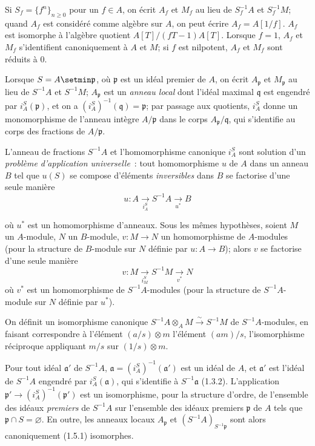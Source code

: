 \begin{env}[1.2.3]
\label{0.1.2.3-fr}
Si $S_f=\{f^n\}_{n\geq 0}$ pour un $f\in A$, on écrit $A_f$ et $M_f$ au lieu de $S_f^{-1}A$ et $S_f^{-1}M$; quand $A_f$ est considéré comme algèbre sur $A$, on peut écrire $A_f=A[1/f]$.
$A_f$ est isomorphe à l'algèbre quotient $A[T]/(fT-1)A[T]$.
Lorsque $f=1$, $A_f$ et $M_f$ s'identifient canoniquement à $A$ et $M$; si $f$ est nilpotent, $A_f$ et $M_f$ sont réduits à $0$.

Lorsque $S=A\setmin\mathfrak{p}$, où $\mathfrak{p}$ est un idéal premier de $A$, on écrit $A_{\mathfrak{p}}$ et $M_{\mathfrak{p}}$ au lieu de $S^{-1}A$ et $S^{-1}M$; $A_{\mathfrak{p}}$ est un \emph{anneau local} dont l'idéal maximal $\mathfrak{q}$ est engendré par $i_A^S(\mathfrak{p})$, et on a $(i_A^S)^{-1}(\mathfrak{q})=\mathfrak{p}$; par passage aux quotients, $i_A^S$ donne un monomorphisme de l'anneau intègre $A/\mathfrak{p}$ dans le corps $A_{\mathfrak{p}}/\mathfrak{q}$, qui s'identifie au corps des fractions de $A/\mathfrak{p}$.
\end{env}

\begin{env}[1.2.4]
\label{0.1.2.4-fr}
L'anneau de fractions $S^{-1}A$ et l'homomorphisme canonique $i_A^S$ sont solution d'un \emph{problème d'application universelle}~: tout homomorphisme $u$ de $A$ dans un anneau $B$ tel que $u(S)$ se compose d'éléments \emph{inversibles} dans $B$ se factorise d'une seule manière
\[
  u:A\xrightarrow[i_A^S]{}S^{-1}A\xrightarrow[u^*]{}B
\]

où $u^*$ est un homomorphisme d'anneaux.
Sous les mêmes hypothèses, soient $M$ un $A$-module, $N$ un $B$-module, $v:M\to N$ un homomorphisme de $A$-modules (pour la structure de $B$-module sur $N$ définie par $u:A\to B$); alors $v$ se factorise d'une seule manière
\[
  v:M\xrightarrow[i_M^S]{}S^{-1}M\xrightarrow[v^*]{}N
\]
où $v^*$ est un homomorphisme de $S^{-1}A$-modules (pour la structure de $S^{-1}A$-module sur $N$ définie par $u^*$).
\end{env}

\begin{env}[1.2.5]
\label{0.1.2.5-fr}
On définit un isomorphisme canonique $S^{-1}A\otimes_A M\xrightarrow{\sim}S^{-1}M$ de $S^{-1}A$-modules, en faisant correspondre à l'élément $(a/s)\otimes m$ l'élément $(am)/s$, l'isomorphisme réciproque appliquant $m/s$ sur $(1/s)\otimes m$.
\end{env}

\begin{env}[1.2.6]
\label{0.1.2.6-fr}
Pour tout idéal $\mathfrak{a}'$ de $S^{-1}A$, $\mathfrak{a}=(i_A^S)^{-1}(\mathfrak{a}')$ est un idéal de $A$, et $\mathfrak{a}'$ est l'idéal de $S^{-1}A$ engendré par $i_A^S(\mathfrak{a})$, qui s'identifie à $S^{-1}\mathfrak{a}$ (1.3.2).
L'application $\mathfrak{p}'\to(i_A^S)^{-1}(\mathfrak{p}')$ est un isomorphisme, pour la structure d'ordre, de l'ensemble des idéaux \emph{premiers} de $S^{-1}A$ sur l'ensemble des idéaux premiers $\mathfrak{p}$ de $A$ tels que $\mathfrak{p}\cap S=\varnothing$.
En outre, les anneaux locaux $A_{\mathfrak{p}}$ et $(S^{-1}A)_{S^{-1}\mathfrak{p}}$ sont alors canoniquement (1.5.1) isomorphes.
\end{env}

